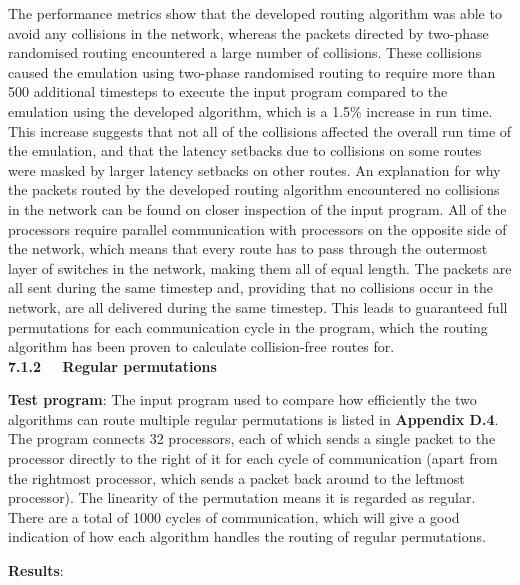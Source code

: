 \documentclass[a4paper, 12pt]{article}
\begin{document}
The performance metrics show that the developed routing algorithm was able to avoid any collisions in the network, whereas the packets directed by two-phase randomised routing encountered a large number of collisions. These collisions caused the emulation using two-phase randomised routing to require more than 500 additional timesteps to execute the input program compared to the emulation using the developed algorithm, which is a 1.5\% increase in run time. This increase suggests that not all of the collisions affected the overall run time of the emulation, and that the latency setbacks due to collisions on some routes were masked by larger latency setbacks on other routes. An explanation for why the packets routed by the developed routing algorithm encountered no collisions in the network can be found on closer inspection of the input program. All of the processors require parallel communication with processors on the opposite side of the network, which means that every route has to pass through the outermost layer of switches in the network, making them all of equal length. The packets are all sent during the same timestep and, providing that no collisions occur in the network, are all delivered during the same timestep. This leads to guaranteed full permutations for each communication cycle in the program, which the routing algorithm has been proven to calculate collision-free routes for.\\

\noindent\textbf{7.1.2 \ \ Regular permutations}

\noindent\textbf{Test program}: The input program used to compare how efficiently the two algorithms can route multiple regular permutations is listed in \textbf{Appendix D.4}. The program connects 32 processors, each of which sends a single packet to the processor directly to the right of it for each cycle of communication (apart from the rightmost processor, which sends a packet back around to the leftmost processor). The linearity of the permutation means it is regarded as regular. There are a total of 1000 cycles of communication, which will give a good indication of how each algorithm handles the routing of regular permutations.

\noindent\textbf{Results}:
\end{document}
